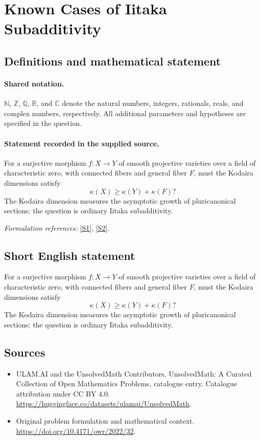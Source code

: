 \documentclass[11pt]{article}
\newcommand{\sref}[2]{\hyperlink{source:#1:#2}{[S#2]}}
\begin{document}
\section{Known Cases of Iitaka Subadditivity}\label{statement}

\subsection{Definitions and mathematical statement}

\paragraph{Shared notation.}$\mathbb N$, $\mathbb Z$, $\mathbb Q$, $\mathbb R$, and $\mathbb C$ denote the natural numbers, integers, rationals, reals, and complex numbers, respectively. All additional parameters and hypotheses are specified in the question.


\paragraph{Statement recorded in the supplied source.}
For a surjective morphism $f:X\to Y$ of smooth projective varieties over a field of characteristic zero, with connected fibers and general fiber $F$, must the Kodaira dimensions satisfy
\[\kappa(X)\geq\kappa(Y)+\kappa(F)?\]
The Kodaira dimension measures the asymptotic growth of pluricanonical sections; the question is ordinary Iitaka subadditivity.
\par\smallskip\textit{Formulation references:} \sref{statement}{1}, \sref{statement}{2}.
\subsection{Short English statement}
For a surjective morphism $f:X\to Y$ of smooth projective varieties over a field of characteristic zero, with connected fibers and general fiber $F$, must the Kodaira dimensions satisfy
\[\kappa(X)\geq\kappa(Y)+\kappa(F)?\]
The Kodaira dimension measures the asymptotic growth of pluricanonical sections; the question is ordinary Iitaka subadditivity.
\subsection{Sources}
\begin{itemize}
\item[\hypertarget{source:statement:1}{S1}] ULAM.AI and the UnsolvedMath Contributors, UnsolvedMath: A Curated Collection of Open Mathematics Problems, catalogue entry. Catalogue attribution under CC BY 4.0.
\url{https://huggingface.co/datasets/ulamai/UnsolvedMath}.
\item[\hypertarget{source:statement:2}{S2}] Original problem formulation and mathematical context.
\url{https://doi.org/10.4171/owr/2022/32}.
\end{itemize}
\label{end:statement}
\end{document}
